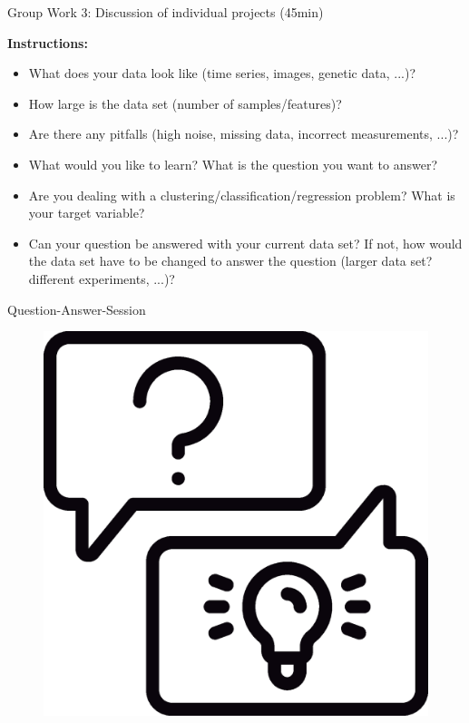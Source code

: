 \documentclass[aspectratio=169]{beamer}
\begin{document}
\begin{frame}{Group Work 3: Discussion of individual projects (45min)}
    
    \textbf{Instructions:}
    \small
    \begin{itemize}
        \item What does your data look like (time series, images, genetic data, ...)?
        \item How large is the data set (number of samples/features)?
        \item Are there any pitfalls (high noise, missing data, incorrect measurements, ...)?
        \item What would you like to learn? What is the question you want to answer?
        \item Are you dealing with a clustering/classification/regression problem? What is your target variable?
        \item Can your question be answered with your current data set? If not, how would the data set have to be changed to answer the question (larger data set?        different experiments, ...)?
    \end{itemize}
\end{frame}

\begin{frame}{Question-Answer-Session}
    \begin{figure}
        \centering
        \includegraphics[scale=0.3]{figures/question_answer.eps}
    \end{figure}
\end{frame}
\end{document}

